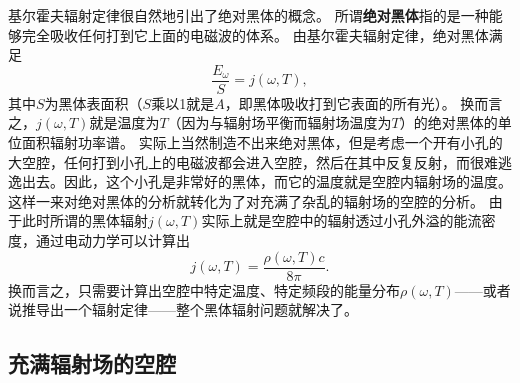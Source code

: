 \documentclass[UTF8, a4paper]{ctexart}
\begin{document}
基尔霍夫辐射定律很自然地引出了绝对黑体的概念。
所谓\textbf{绝对黑体}指的是一种能够完全吸收任何打到它上面的电磁波的体系。
由基尔霍夫辐射定律，绝对黑体满足
\begin{equation}
    \frac{E_\omega}{S} = j(\omega, T),
\end{equation}
其中$S$为黑体表面积（$S$乘以1就是$A$，即黑体吸收打到它表面的所有光）。
换而言之，$j(\omega, T)$就是温度为$T$（因为与辐射场平衡而辐射场温度为$T$）的绝对黑体的单位面积辐射功率谱。
实际上当然制造不出来绝对黑体，但是考虑一个开有小孔的大空腔，任何打到小孔上的电磁波都会进入空腔，然后在其中反复反射，而很难逃逸出去。因此，这个小孔是非常好的黑体，而它的温度就是空腔内辐射场的温度。
这样一来对绝对黑体的分析就转化为了对充满了杂乱的辐射场的空腔的分析。
由于此时所谓的黑体辐射$j(\omega, T)$实际上就是空腔中的辐射透过小孔外溢的能流密度，通过电动力学可以计算出
\begin{equation}
    j(\omega, T) = \frac{\rho(\omega, T) c}{8 \pi}.
\end{equation}
换而言之，只需要计算出空腔中特定温度、特定频段的能量分布$\rho(\omega, T)$——或者说推导出一个辐射定律——整个黑体辐射问题就解决了。

\subsection{充满辐射场的空腔}
\end{document}
